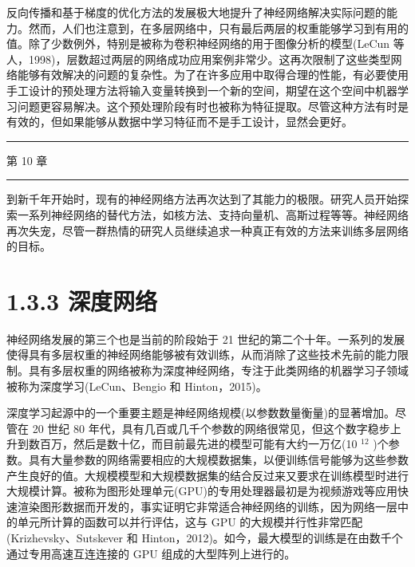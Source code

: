 \documentclass[10pt]{report}
\newcommand{\HRule}{\begin{center}\rule{0.9\linewidth}{0.2mm}\end{center}}
\begin{document}
反向传播和基于梯度的优化方法的发展极大地提升了神经网络解决实际问题的能力。然而，人们也注意到，在多层网络中，只有最后两层的权重能够学习到有用的值。除了少数例外，特别是被称为卷积神经网络的用于图像分析的模型(LeCun 等人，1998)，层数超过两层的网络成功应用案例非常少。这再次限制了这些类型网络能够有效解决的问题的复杂性。为了在许多应用中取得合理的性能，有必要使用手工设计的预处理方法将输入变量转换到一个新的空间，期望在这个空间中机器学习问题更容易解决。这个预处理阶段有时也被称为特征提取。尽管这种方法有时是有效的，但如果能够从数据中学习特征而不是手工设计，显然会更好。

\HRule

第 10 章

\HRule

到新千年开始时，现有的神经网络方法再次达到了其能力的极限。研究人员开始探索一系列神经网络的替代方法，如核方法、支持向量机、高斯过程等等。神经网络再次失宠，尽管一群热情的研究人员继续追求一种真正有效的方法来训练多层网络的目标。

\section*{1.3.3 深度网络}

神经网络发展的第三个也是当前的阶段始于 21 世纪的第二个十年。一系列的发展使得具有多层权重的神经网络能够被有效训练，从而消除了这些技术先前的能力限制。具有多层权重的网络被称为深度神经网络，专注于此类网络的机器学习子领域被称为深度学习(LeCun、Bengio 和 Hinton，2015)。

深度学习起源中的一个重要主题是神经网络规模(以参数数量衡量)的显著增加。尽管在 20 世纪 80 年代，具有几百或几千个参数的网络很常见，但这个数字稳步上升到数百万，然后是数十亿，而目前最先进的模型可能有大约一万亿(10 \({}^{12}\) )个参数。具有大量参数的网络需要相应的大规模数据集，以便训练信号能够为这些参数产生良好的值。大规模模型和大规模数据集的结合反过来又要求在训练模型时进行大规模计算。被称为图形处理单元(GPU)的专用处理器最初是为视频游戏等应用快速渲染图形数据而开发的，事实证明它非常适合神经网络的训练，因为网络一层中的单元所计算的函数可以并行评估，这与 GPU 的大规模并行性非常匹配(Krizhevsky、Sutskever 和 Hinton，2012)。如今，最大模型的训练是在由数千个通过专用高速互连连接的 GPU 组成的大型阵列上进行的。
\end{document}
